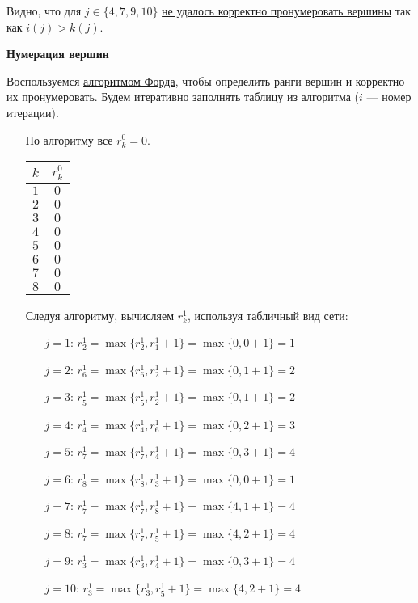 \begin{itemize}[nosep]
	Видно, что для $j \in \{4, 7, 9, 10\}$ \underline{не удалось корректно пронумеровать вершины} так как $i(j) > k(j)$.

\end{itemize}

\bigskip

\textbf{Нумерация вершин}

Воспользуемся \hyperref[alg:ford]{алгоритмом Форда}, чтобы определить ранги вершин и корректно их пронумеровать. Будем итеративно заполнять таблицу из алгоритма ($i$ --- номер итерации).

\begin{itemize}[nosep]
	\item[\fbox{$i=0$}] По алгоритму все $r_k^0 = 0$.

	\begin{table}[H]
		\centering
		\begin{tabular}{ | c | c | } 
			\hline
			$k$ & $r_k^0$ \\ \hline
			$1$ & $0$ \\ \hline
			$2$ & $0$ \\ \hline
			$3$ & $0$ \\ \hline
			$4$ & $0$ \\ \hline
			$5$ & $0$ \\ \hline
			$6$ & $0$ \\ \hline
			$7$ & $0$ \\ \hline
			$8$ & $0$ \\ \hline
		\end{tabular}
	\end{table}

	\item[\fbox{$i=1$}] Следуя алгоритму, вычисляем $r^1_k$, используя табличный вид сети:

	\begin{enumerate}[nosep]
		\item[\underline{$j=1$}:] $r_2^1 = \max\{r_2^1, r_1^1 + 1\} = \max\{0,0+1\} = 1$
		\item[\underline{$j=2$}:] $r_6^1 = \max\{r_6^1, r_2^1 + 1\} = \max\{0,1+1\} = 2$
		\item[\underline{$j=3$}:] $r_5^1 = \max\{r_5^1, r_2^1 + 1\} = \max\{0,1+1\} = 2$
		\item[\underline{$j=4$}:] $r_4^1 = \max\{r_4^1, r_6^1 + 1\} = \max\{0,2+1\} = 3$
		\item[\underline{$j=5$}:] $r_7^1 = \max\{r_7^1, r_4^1 + 1\} = \max\{0,3+1\} = 4$
		\item[\underline{$j=6$}:] $r_8^1 = \max\{r_8^1, r_3^1 + 1\} = \max\{0,0+1\} = 1$
		\item[\underline{$j=7$}:] $r_7^1 = \max\{r_7^1, r_8^1 + 1\} = \max\{4,1+1\} = 4$
		\item[\underline{$j=8$}:] $r_7^1 = \max\{r_7^1, r_5^1 + 1\} = \max\{4,2+1\} = 4$
		\item[\underline{$j=9$}:] $r_3^1 = \max\{r_3^1, r_4^1 + 1\} = \max\{0,3+1\} = 4$
		\item[\underline{$j=10$}:] $r_3^1 = \max\{r_3^1, r_5^1 + 1\} = \max\{4,2+1\} = 4$
	\end{enumerate}


\end{itemize}
